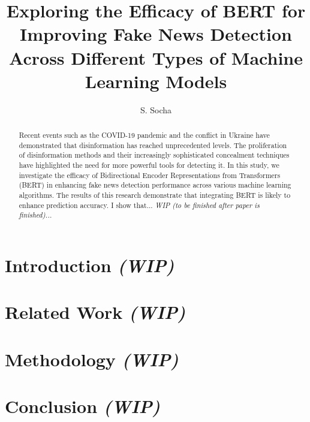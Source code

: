 \documentclass[
  journal=largetwo,
  manuscript=article-type,
  year=2023,
  volume=1,
]{cup-journal}
\title{Exploring the Efficacy of BERT for Improving Fake News Detection Across Different Types of Machine Learning Models}
\author{S. Socha}
\affiliation{Faculty of Economic Sciences, University of Warsaw, Warsaw, Poland}
\begin{document}
\begin{abstract}
Recent events such as the COVID-19 pandemic and the conflict in Ukraine have demonstrated that disinformation has reached unprecedented levels. The proliferation of disinformation methods and their increasingly sophisticated concealment techniques have highlighted the need for more powerful tools for detecting it. In this study, we investigate the efficacy of Bidirectional Encoder Representations from Transformers (BERT) in enhancing fake news detection performance across various machine learning algorithms. The results of this research demonstrate that integrating BERT is likely to enhance prediction accuracy. I show that... \textit{WIP (to be finished after paper is finished)...}
\end{abstract}


\section{Introduction \textit{(WIP)}}


\section{Related Work \textit{(WIP)}}


\section{Methodology \textit{(WIP)}}


\section{Conclusion \textit{(WIP)}}




\printendnotes

\printbibliography
\end{document}
